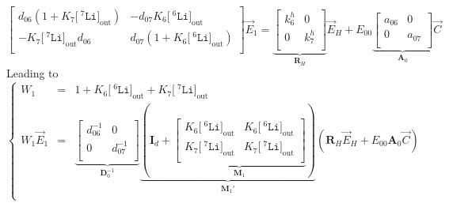 \documentclass[aps,onecolumn,11pt]{revtex4}
\newcommand{\mychem}[1]{\mathtt{#1}}
\newcommand{\myconc}[1]{\big[#1\big]}
\newcommand{\spLi}[1]{{\!~^{#1}\mychem{Li}}}
\newcommand{\Li}[1]{\myconc{\spLi{#1}}}
\newcommand{\myout}[1]{{#1}_{\mathrm{out}}}
\newcommand{\LiOut}[1]{\myout{\Li{#1}}}
\newcommand{\mymat}[1]{{\bm{#1}}}
\begin{document}
\begin{equation}
\begin{bmatrix}
d_{06} \left(1+ K_7\LiOut{7}\right) & -d_{07}K_6\LiOut{6}\\
-K_7\LiOut{7}d_{06} & d_{07}\left(1 + K_6\LiOut{6}\right) \\
\end{bmatrix}
\vec{E}_1 = \underbrace{
\begin{bmatrix}
	k^h_6 & 0 \\
	0     & k^h_7\\
\end{bmatrix}
}_{\mymat{R}_H}
\vec{E}_H 
+ E_{00}
\underbrace{
\begin{bmatrix}
a_{06} & 0 \\
0 & a_{07} \\
\end{bmatrix}
}_{\mymat{A}_0}
\vec{C}
\end{equation}
Leading to
\begin{equation}
\left\lbrace
\begin{array}{rcl}
W_1 & = & 1 +    K_6\LiOut{6} +  K_7 \LiOut{7}  \\
W_1 \vec{E}_1 & = & \underbrace{
\begin{bmatrix}
d_{06}^{-1} & 0 \\
0 & d_{07}^{-1} \\
\end{bmatrix}
}_{\mymat{D}_0^{-1}}
\underbrace{
\left(
\mymat{I}_d+
\underbrace{
	\begin{bmatrix}
	K_6\LiOut{6} & K_6\LiOut{6}\\
	K_7\LiOut{7} & K_7 \LiOut{7}\\
	\end{bmatrix}
	}_{\mymat{M}_1}
		\right)}_{\mymat{M}_1'}
	\left( 
	\mymat{R}_H \vec{E}_H + E_{00} \mymat{A}_0 \vec{C}
	\right)
	\\
\end{array}
\right.
\end{equation}
\end{document}
